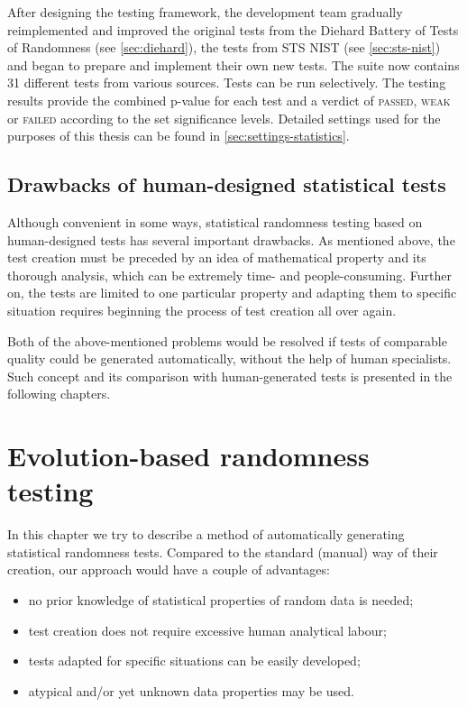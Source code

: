 \documentclass[12pt,oneside]{fithesis2}
\newcommand{\squarebullet}{\textcolor{black}{\raisebox{0.15em}{\rule{4pt}{4pt}}}}
\newenvironment{myItemize}{
  \begin{itemize}[leftmargin=2em,rightmargin=1em,itemsep=\parskip ,parsep=0em,topsep=0em,partopsep=0em]
  \renewcommand{\labelitemi}{\squarebullet}
  \renewcommand{\labelitemii}{$\diamond$}
}{
  \end{itemize}
}
\begin{document}
After designing the testing framework, the development team gradually reimplemented and improved the original tests from 
the Diehard Battery of Tests of Randomness (see \autoref{sec:diehard}), 
the tests from STS NIST (see \autoref{sec:sts-nist}) and began to prepare and implement their own new tests.
The suite now contains 31 different tests from various sources. Tests can be run selectively.
The testing results provide the combined p-value for each test and a verdict of \textsc{passed}, \textsc{weak} or \textsc{failed}
according to the set significance levels.
Detailed settings used for the purposes of this thesis can be found in \autoref{sec:settings-statistics}.

\section{Drawbacks of human-designed statistical tests}
\label{sec:limits-stat-testing}

Although convenient in some ways, statistical randomness testing based on human-designed tests has several important drawbacks.
As mentioned above, the test creation must be preceded by an idea of mathematical property and its thorough analysis, 
which can be extremely time- and people-consuming. Further on, the tests are limited to one particular property and
adapting them to specific situation requires beginning the process of test creation all over again.

Both of the above-mentioned problems would be resolved if tests of comparable quality could be generated automatically, without 
the help of human specialists. Such concept and its comparison with human-generated tests is presented in the following chapters.

\chapter{Evolution-based randomness testing}
\label{chap:evo-based-testing}

In this chapter we try to describe a method of automatically generating statistical randomness tests. Compared to the standard
(manual) way of their creation, our approach would have a couple of advantages: 
\begin{myItemize}
\item no prior knowledge of statistical properties of random data is needed;
\item test creation does not require excessive human analytical labour;
\item tests adapted for specific situations can be easily developed;
\item atypical and/or yet unknown data properties may be used.
\end{myItemize}
\end{document}
